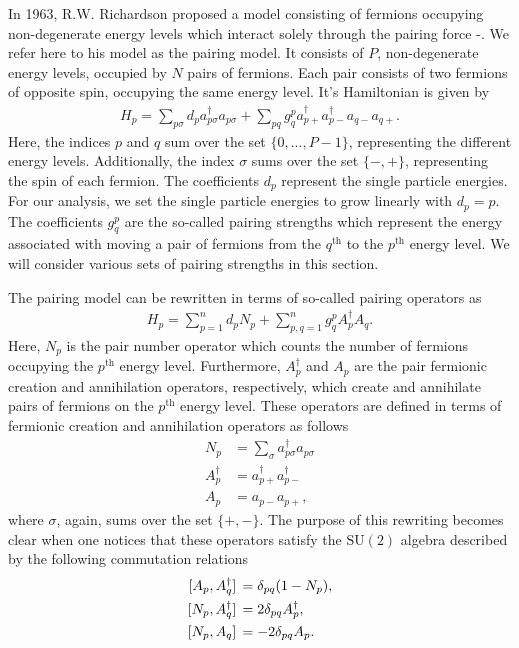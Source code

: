 \documentclass[10pt]{article}
\begin{document}
In 1963, R.W. Richardson proposed a model consisting of fermions occupying non-degenerate energy levels which interact solely through the pairing force \cite{ref:rich1}-\cite{ref:rich2}. We refer here to his model as the pairing model. It consists of $P$, non-degenerate energy levels, occupied by $N$ pairs of fermions. Each pair consists of two fermions of opposite spin, occupying the same energy level. It's Hamiltonian is given by
\begin{align}
\label{pairing_model_hamiltonian_original}
H_p=\sum_{p\sigma}d_pa^\dagger_{p\sigma}a_{p\sigma}+\sum_{pq}g^p_qa^{\dagger}_{p+}a^{\dagger}_{p-}a_{q-}a_{q+}.
\end{align}
Here, the indices $p$ and $q$ sum over the set $\{0,...,P-1\}$, representing the different energy levels. Additionally, the index $\sigma$ sums over the set $\{-,+\}$, representing the spin of each fermion. The coefficients $d_p$ represent the single particle energies. For our analysis, we set the single particle energies to grow linearly with $d_p=p$. The coefficients $g^p_q$ are the so-called pairing strengths which represent the energy associated with moving a pair of fermions from the $q^{\text{th}}$ to the $p^{\text{th}}$ energy level. We will consider various sets of pairing strengths in this section. 

The pairing model can be rewritten in terms of so-called pairing operators as
\begin{align}
\label{pairing_model_hamiltonian}
H_p=\sum_{p=1}^nd_pN_p+\sum_{p,q=1}^ng^p_qA^\dagger_pA_q
.\end{align}
Here, $N_p$ is the pair number operator which counts the number of fermions occupying the $p^{\text{th}}$ energy level. Furthermore, $A^\dagger_p$ and $A_p$ are the pair fermionic creation and annihilation operators, respectively, which create and annihilate pairs of fermions on the $p^{\text{th}}$ energy level. These operators are defined in terms of fermionic creation and annihilation operators as follows
\begin{align}
\label{pair_fermionic_operators}
N_p &= \sum_{\sigma}a^\dagger_{p\sigma}a_{p\sigma}
\\
A^{\dagger}_p &= a^{\dagger}_{p+}a^{\dagger}_{p-}
\\
A_p &= a_{p-}a_{p+},
\end{align}
where $\sigma$, again, sums over the set $\{+,-\}$. The purpose of this rewriting becomes clear when one notices that these operators satisfy the $\text{SU}(2)$ algebra described by the following commutation relations
\begin{align}
\label{AAd_comm}
\comm*{A_p}{A^\dagger_q}&=\delta_{pq}(1-N_p),
\\
\label{NAd_comm}
\comm*{N_p}{A^\dagger_q}&=2\delta_{pq}A^\dagger_p,
\\
\label{NA_comm}
\comm*{N_p}{A_q}&=-2\delta_{pq}A_p.
\end{align}
\end{document}

